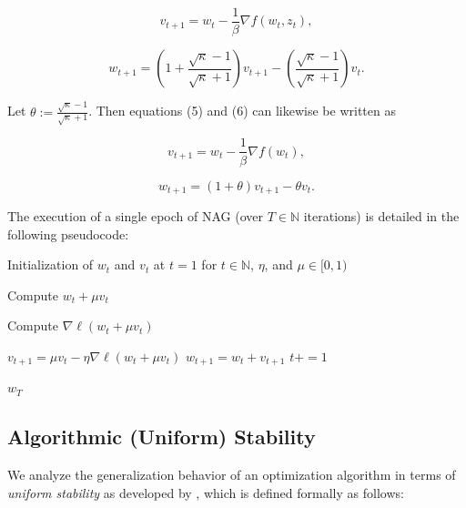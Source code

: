 \documentclass[twoside,11pt]{article}
\begin{document}
\begin{equation}
v_{t+1} = w_t - \frac{1}{\beta} \nabla f (w_t, z_t),
\end{equation}

\begin{equation}
w_{t+1} = (1 + \frac{\sqrt{\kappa}-1}{\sqrt{\kappa}+1})v_{t+1} - (\frac{\sqrt{\kappa}-1}{\sqrt{\kappa}+1})v_t.
\end{equation}

\noindent
Let $\theta := \frac{\sqrt{\kappa}-1}{\sqrt{\kappa}+1}$. Then equations (5) and (6) can likewise be written as

\begin{equation}
v_{t+1} = w_t - \frac{1}{\beta} \nabla f(w_t),
\end{equation}

\begin{equation}
w_{t+1} = (1 + \theta)v_{t+1} - \theta v_t.
\end{equation}

\noindent
The execution of a single epoch of NAG (over $T \in \mathbb{N}$ iterations) is detailed in the following pseudocode:

\begin{algorithm}[H]
\caption{Nesterov Accelerated Gradient (NAG)}\label{alg:cap}
\begin{algorithmic}

\Require Initialization of $w_t$ and $v_t$ at $t=1$ for $t \in \mathbb{N}$, $\eta$, and $\mu \in [0,1)$

    \State Compute $w_t + \mu v_t$

    \State Compute $\nabla \ell (w_t + \mu v_t)$

    \State $v_{t+1} = \mu v_t - \eta \nabla \ell(w_t + \mu v_t)$
    \State $w_{t+1} = w_t + v_{t+1}$
    \State $t += 1$
\EndWhile

\noindent
\Return $w_T$
\end{algorithmic}
\end{algorithm}

\subsection{Algorithmic (Uniform) Stability}

We analyze the generalization behavior of an optimization algorithm in terms of \textit{uniform stability} as developed by \cite{BE02}, which is defined formally as follows:
\end{document}
